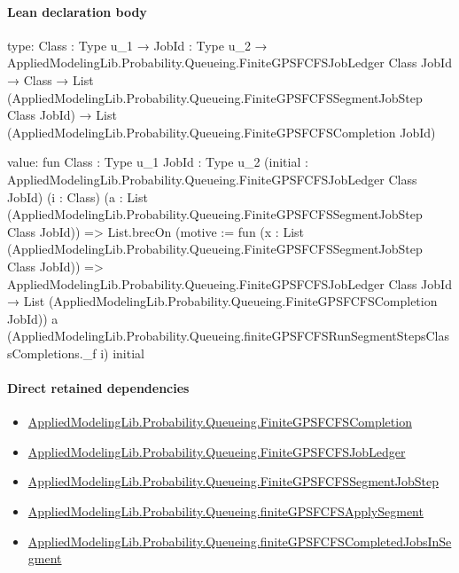 \documentclass[10pt]{article}
\begin{document}
\paragraph{Lean declaration body}
\begin{ReviewVerbatim}
type:
{Class : Type u_1} →
  {JobId : Type u_2} →
    AppliedModelingLib.Probability.Queueing.FiniteGPSFCFSJobLedger Class JobId →
      Class →
        List (AppliedModelingLib.Probability.Queueing.FiniteGPSFCFSSegmentJobStep Class JobId) →
          List (AppliedModelingLib.Probability.Queueing.FiniteGPSFCFSCompletion JobId)

value:
fun {Class : Type u_1} {JobId : Type u_2}
    (initial : AppliedModelingLib.Probability.Queueing.FiniteGPSFCFSJobLedger Class JobId) (i : Class)
    (a : List (AppliedModelingLib.Probability.Queueing.FiniteGPSFCFSSegmentJobStep Class JobId)) =>
  List.brecOn (motive :=
    fun (x : List (AppliedModelingLib.Probability.Queueing.FiniteGPSFCFSSegmentJobStep Class JobId)) =>
    AppliedModelingLib.Probability.Queueing.FiniteGPSFCFSJobLedger Class JobId →
      List (AppliedModelingLib.Probability.Queueing.FiniteGPSFCFSCompletion JobId))
    a (AppliedModelingLib.Probability.Queueing.finiteGPSFCFSRunSegmentStepsClassCompletions._f i) initial
\end{ReviewVerbatim}

\paragraph{Direct retained dependencies}
\begin{itemize}\raggedright
\item \hyperlink{governing-declaration-73bff5fa8f16fe86}{Applied\allowbreak{}Modeling\allowbreak{}Lib.\allowbreak{}Probability.\allowbreak{}Queueing.\allowbreak{}Finite\allowbreak{}GPSFCFS\allowbreak{}Completion}
\item \hyperlink{governing-declaration-a1f4b709970abde9}{Applied\allowbreak{}Modeling\allowbreak{}Lib.\allowbreak{}Probability.\allowbreak{}Queueing.\allowbreak{}Finite\allowbreak{}GPSFCFS\allowbreak{}Job\allowbreak{}Ledger}
\item \hyperlink{governing-declaration-8fcaf575fc5b34e1}{Applied\allowbreak{}Modeling\allowbreak{}Lib.\allowbreak{}Probability.\allowbreak{}Queueing.\allowbreak{}Finite\allowbreak{}GPSFCFS\allowbreak{}Segment\allowbreak{}Job\allowbreak{}Step}
\item \hyperlink{governing-declaration-1670134c866d263f}{Applied\allowbreak{}Modeling\allowbreak{}Lib.\allowbreak{}Probability.\allowbreak{}Queueing.\allowbreak{}finite\allowbreak{}GPSFCFS\allowbreak{}Apply\allowbreak{}Segment}
\item \hyperlink{governing-declaration-02624e4a7a6cec29}{Applied\allowbreak{}Modeling\allowbreak{}Lib.\allowbreak{}Probability.\allowbreak{}Queueing.\allowbreak{}finite\allowbreak{}GPSFCFS\allowbreak{}Completed\allowbreak{}Jobs\allowbreak{}In\allowbreak{}Segment}
\end{itemize}
\hypertarget{governing-declaration-2221afd6aa88f087}{}
\end{document}
